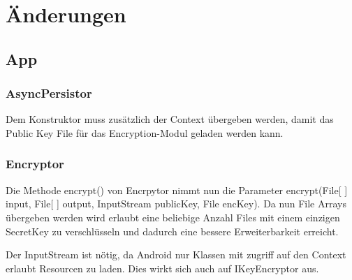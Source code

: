 \chapter{Änderungen} \label{chap:Aenderungen}

\section{App}

\subsection{AsyncPersistor}
Dem Konstruktor muss zusätzlich der Context übergeben werden, damit das Public Key File für das Encryption-Modul geladen werden kann.

\subsection{Encryptor}
Die Methode encrypt() von Encrpytor nimmt nun die Parameter encrypt(File[ ] input, File[ ] output, InputStream publicKey, File encKey). Da nun File Arrays übergeben werden wird erlaubt eine beliebige Anzahl Files mit einem einzigen SecretKey zu verschlüsseln und dadurch eine bessere Erweiterbarkeit erreicht. \par   
Der InputStream ist nötig, da Android nur Klassen mit zugriff auf den Context erlaubt Resourcen zu laden. Dies wirkt sich auch auf IKeyEncryptor aus.

